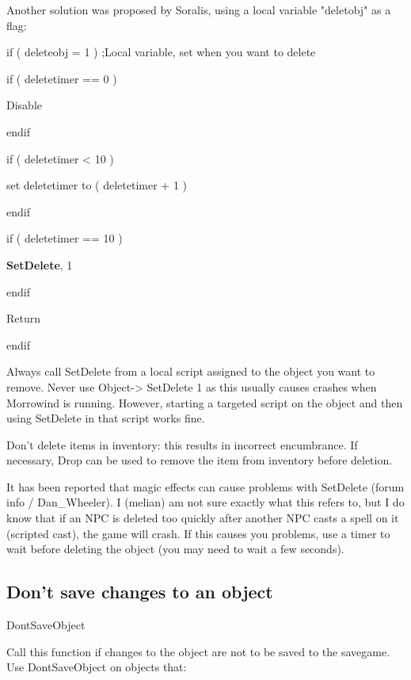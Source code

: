 

Another solution was proposed by Soralis, using a local variable
"deletobj" as a flag:


if ( deleteobj = 1 ) ;Local variable, set when you want to delete

if ( deletetimer == 0 )

Disable

endif

if ( deletetimer < 10 )

set deletetimer to ( deletetimer + 1 )

endif

if ( deletetimer == 10 )

\textbf{SetDelete}, 1

endif

Return

endif

Always call SetDelete from a local script assigned to the object you
want to remove. Never use Object-> SetDelete 1 as this
usually causes crashes when Morrowind is running. However, starting a
targeted script on the object and then using SetDelete in that script
works fine.

Don't delete items in inventory: this results in incorrect encumbrance.
If necessary, Drop can be used to remove the item from inventory before
deletion.

It has been reported that magic effects can cause problems with
SetDelete (forum info / Dan\_Wheeler). I (melian) am not sure exactly
what this refers to, but I do know that if an NPC is deleted too quickly
after another NPC casts a spell on it (scripted cast), the game will
crash. If this causes you problems, use a timer to wait before deleting
the object (you may need to wait a few seconds).

\hypertarget{dont-save-changes-to-an-object}{%
\subsection{\texorpdfstring{\hfill\break
Don't save changes to an
object}{ Don't save changes to an object}}\label{dont-save-changes-to-an-object}}

DontSaveObject

Call this function if changes to the object are not to be saved to the
savegame.\\
Use DontSaveObject on objects that:

